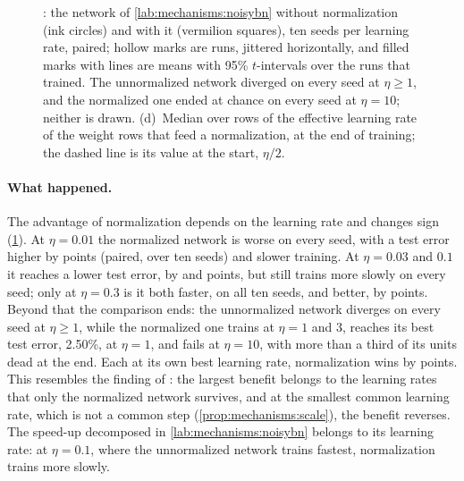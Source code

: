 \begin{refsection}
\begin{figure}[t]
\begin{fullwidth}
\caption{: the network of \cref{lab:mechanisms:noisybn} without normalization (ink circles) and with it (vermilion squares), ten seeds per learning rate, paired; hollow marks are runs, jittered horizontally, and filled marks with lines are means with 95\% $t$-intervals over the runs that trained. The unnormalized network diverged on every seed at $\eta\ge1$, and the normalized one ended at chance on every seed at $\eta=10$; neither is drawn. (d)~Median over rows of the effective learning rate of the weight rows that feed a normalization, at the end of training; the dashed line is its value at the start, $\eta/2$.}
\label{fig:mechanisms:lr}
\end{fullwidth}
\end{figure}

\paragraph{What happened.} The advantage of normalization depends on the learning rate and changes sign (\cref{fig:mechanisms:lr}). At $\eta=0.01$ the normalized network is worse on every seed, with a test error higher by  points (paired, over ten seeds) and slower training. At $\eta=0.03$ and $0.1$ it reaches a lower test error, by  and  points, but still trains more slowly on every seed; only at $\eta=0.3$ is it both faster, on all ten seeds, and better, by  points. Beyond that the comparison ends: the unnormalized network diverges on every seed at $\eta\ge1$, while the normalized one trains at $\eta=1$ and $3$, reaches its best test error, 2.50\%, at $\eta=1$, and fails at $\eta=10$, with more than a third of its units dead at the end. Each at its own best learning rate, normalization wins by  points. This resembles the finding of \textcite{BjorckEtAl2018}: the largest benefit belongs to the learning rates that only the normalized network survives, and at the smallest common learning rate, which is not a common step (\cref{prop:mechanisms:scale}), the benefit reverses. The speed-up decomposed in \cref{lab:mechanisms:noisybn} belongs to its learning rate: at $\eta=0.1$, where the unnormalized network trains fastest, normalization trains more slowly.


\end{refsection}
